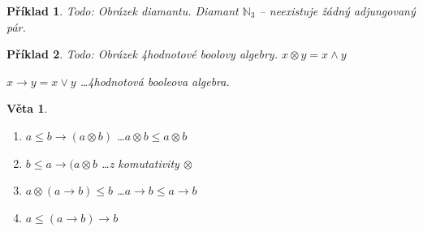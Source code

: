 \documentclass[10pt, a4paper, titlepage]{article}
\theoremstyle{note}
\newtheorem{veta}{Věta}
\newtheorem{priklad}{Příklad}
\begin{document}
\begin{priklad}
Todo: Obrázek diamantu. Diamant $\mathbb{N}_{3}$ -- neexistuje žádný adjungovaný pár.
\end{priklad}
\begin{priklad}
Todo: Obrázek 4hodnotové boolovy algebry. $x\otimes y=x\wedge y$

$x\rightarrow y = x\vee y$ \dots 4hodnotová booleova algebra.
\end{priklad}
\begin{veta}
\begin{enumerate}
\renewcommand{\labelenumi}{(\alph{enumi})}
\item $a\leq b \rightarrow(a\otimes b)$ \dots $a\otimes b\leq a\otimes b$
\item $b\leq a \rightarrow(a\otimes b$ \dots z komutativity $\otimes$
\item $a\otimes (a\rightarrow b) \leq b$ \dots $a\rightarrow b\leq a\rightarrow b$
\item $a\leq (a\rightarrow b) \rightarrow b$
\end{enumerate}
\end{veta}
\end{document}
